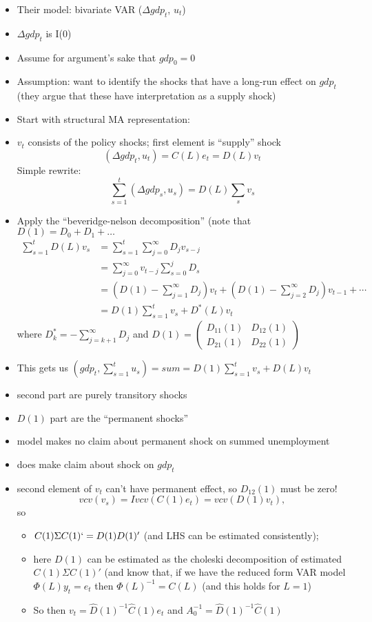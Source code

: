 \begin{itemize}
\item Their model: bivariate VAR ($\Delta  gdp_t$, $u_t$)
\item $\Delta  gdp_t$ is I(0)
\item Assume for argument's sake that $gdp_0 = 0$
\item Assumption: want to identify the shocks that have a long-run
  effect on $gdp_t$ (they argue that these have interpretation as a
  supply shock)
\item Start with structural MA representation:
\item $v_t$ consists of the policy shocks; first element is ``supply''
  shock
  \[( \Delta  gdp_t, u_t ) = C(L) e_t = D(L) v_t\]
  Simple rewrite:
  \[ \sum_{s=1}^t (\Delta  gdp_s, u_s) = D(L) \sum_s v_s \]
\item Apply the ``beveridge-nelson decomposition'' (note that $D(1) =
  D_0 + D_1 + \dots$
  \begin{align*}
    \sum_{s=1}^t D(L) v_s
    &= \sum_{s=1}^t \sum_{j=0}^\infty D_j v_{s-j} \\
    &= \sum_{j=0}^\infty v_{t-j} \sum_{s=0}^j D_s \\
    &= (D(1) - \sum_{j=1}^\infty D_j) v_t + (D(1) - \sum_{j=2}^\infty D_j) v_{t-1} + \cdots \\
    &= D(1) \sum_{s=1}^t v_s + D^*(L) v_t
  \end{align*}
  where $D_k^* = - \sum_{j=k+1}^\infty D_j$ and
  $D(1) = \begin{pmatrix}
    D_{11}(1) & D_{12}(1) \\ D_{21}(1) & D_{22}(1)
  \end{pmatrix}$
\item This gets us $(gdp_t, \sum_{s=1}^t u_s) = sum = D(1) \sum_{s=1}^t v_s
  + D(L) v_t$
\item second part are purely transitory shocks
\item $D(1)$ part are the ``permanent shocks''
\item model makes no claim about permanent
  shock on summed unemployment
\item does make claim about shock on
  $gdp_t$
\item second element of $v_t$ can't have permanent effect, so
  $D_{12}(1)$ must be zero!
  \[vcv(v_s) = I vcv(C(1) e_t) = vcv(D(1) v_t),\]
  so
  \begin{itemize}
  \item $C(1) \Sigma C(1)`= D(1) D(1)'$ (and LHS can be estimated
    consistently);
  \item here $D(1)$ can be estimated as the choleski decomposition of
    estimated $C(1) \Sigma C(1)'$ (and know that, if we have the reduced
    form VAR model $\Phi(L) y_t = e_t$ then $\Phi(L)^{-1} = C(L)$ (and this
    holds for $L = 1$)
  \item So then $v_t = \hat D(1)^{-1} \hat C(1) e_t$ and $A_0^{-1} =
    \hat D(1)^{-1} \hat C(1)$
  \end{itemize}
\end{itemize}

